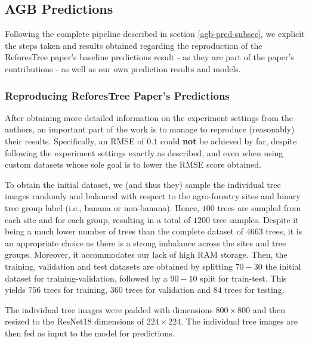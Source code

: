 \documentclass[10pt,twocolumn,letterpaper]{article}
\begin{document}
\subsection{AGB Predictions}
Following the complete pipeline described in section \ref{agb-pred-subsec}, we explicit the steps taken and results obtained regarding the reproduction of the ReforesTree paper's baseline predictions result - as they are part of the paper's contributions - as well as our own prediction results and models. 
\subsubsection{Reproducing ReforesTree Paper's Predictions}
After obtaining more detailed information on the experiment settings from the authors, an important part of the work is to manage to reproduce (reasonably) their results. Specifically, an RMSE of $0.1$ could \textbf{not} be achieved by far, despite following the experiment settings exactly as described, and even when using custom datasets whose sole goal is to lower the RMSE score obtained.

To obtain the initial dataset, we (and thus they) sample the individual tree images randomly and balanced with respect to the agro-forestry sites and binary tree group label (i.e., banana or non-banana). Hence, $100$ trees are sampled from each site and for each group, resulting in a total of $1200$ tree samples. Despite it being a much lower number of trees than the complete dataset of $4663$ trees, it is an appropriate choice as there is a strong imbalance across the sites and tree groups. Moreover, it accommodates our lack of high RAM storage. Then, the training, validation and test datasets are obtained by splitting $70-30$ the initial dataset for training-validation, followed by a $90-10$ split for train-test. This yields $756$ trees for training, $360$ trees for validation and $84$ trees for testing. 

The individual tree images were padded with dimensions $800 \times 800$ and then resized to the ResNet18\cite{https://doi.org/10.48550/arxiv.1512.03385} dimensions of $224 \times 224$. The individual tree images are then fed as input to the model for predictions.
\end{document}

